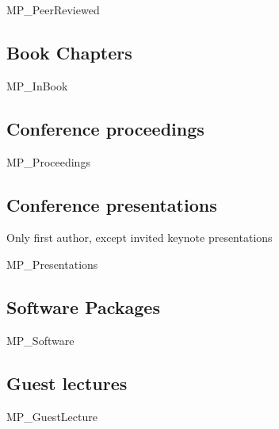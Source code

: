 \documentclass[a4paper]{article}
\begin{document}
\begin{btSect}{MP_PeerReviewed}
\btPrintAll
\end{btSect}


\subsection{Book Chapters}

\begin{btSect}{MP_InBook}
\btPrintAll
\end{btSect}


\subsection{Conference proceedings}

\begin{btSect}{MP_Proceedings}
\btPrintAll
\end{btSect}


\subsection{Conference presentations}

Only first author, except invited keynote presentations
\begin{btSect}{MP_Presentations}
\btPrintAll
\end{btSect}

\subsection{Software Packages}

\begin{btSect}{MP_Software}
\btPrintAll
\end{btSect}


\subsection{Guest lectures}

\begin{btSect}{MP_GuestLecture}
\btPrintAll
\end{btSect}
\end{document}

